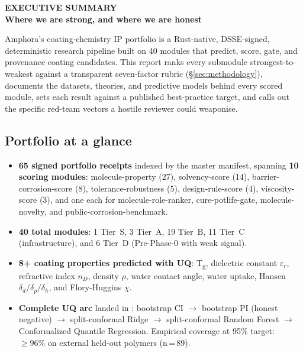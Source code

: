 \documentclass[10pt,a4paper]{article}
\newcommand{\PageTitle}[2]{%
  {\sffamily\fontsize{7.5}{9}\selectfont\bfseries\color{Cyan}\MakeUppercase{#1}}\\[-1pt]
  {\sffamily\fontsize{20}{22}\selectfont\bfseries\color{Navy}#2}\par\vspace{3mm}}
\newcommand{\code}[1]{{\ttfamily\fontsize{7.2}{8.4}\selectfont\detokenize{#1}}}
\begin{document}
\newpage

\PageTitle{Executive summary}{Where we are strong, and where we are honest}

Amphora's coating-chemistry IP portfolio is a Rust-native, DSSE-signed, deterministic
research pipeline built on 40 modules that predict, score, gate, and provenance
coating candidates. This report ranks every submodule strongest-to-weakest against a
transparent seven-factor rubric (\S\ref{sec:methodology}), documents the datasets,
theories, and predictive models behind every scored module, sets each result against
a published best-practice target, and calls out the specific red-team vectors a
hostile reviewer could weaponise.

\vspace{-1mm}
\subsection*{Portfolio at a glance}
\begin{tcolorbox}[enhanced,colback=Panel,colframe=Line,boxrule=.4pt,arc=1.8mm,left=3mm,right=3mm,top=2mm,bottom=2mm]
\begin{itemize}
\item \textbf{65 signed portfolio receipts} indexed by the master manifest, spanning
\textbf{10 scoring modules}: molecule-property (27), solvency-score (14), barrier-corrosion-score
(8), tolerance-robustness (5), design-rule-score (4), viscosity-score (3), and one
each for molecule-role-ranker, cure-potlife-gate, molecule-novelty, and public-corrosion-benchmark.
\item \textbf{40 total \code{amphora-*} modules}: 1 Tier~S, 3 Tier~A, 19 Tier~B, 11
Tier~C (infrastructure), and 6 Tier~D (Pre-Phase-0 with weak signal).
\item \textbf{8+ coating properties predicted with UQ}: T\textsubscript{g}, dielectric
constant \(\varepsilon_r\), refractive index \(n_D\), density \(\rho\), water contact
angle, water uptake, Hansen \(\delta_d/\delta_p/\delta_h\), and Flory-Huggins \(\chi\).
\item \textbf{Complete UQ arc} landed in \code{amphora-tolerance-robustness}:
bootstrap CI \(\rightarrow\) bootstrap PI (honest negative) \(\rightarrow\)
split-conformal Ridge \(\rightarrow\) split-conformal Random Forest \(\rightarrow\)
Conformalized Quantile Regression. Empirical coverage at 95\% target: \(\geq 96\%\)
on external held-out polymers (n\,=\,89).
\end{itemize}
\end{tcolorbox}
\end{document}
